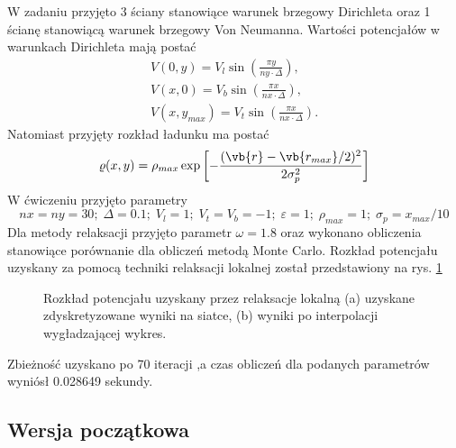 \documentclass[a4paper, 12pt]{article}
\begin{document}
	W zadaniu przyjęto 3 ściany stanowiące warunek brzegowy Dirichleta oraz 1 ścianę stanowiącą warunek brzegowy Von Neumanna. 
	Wartości potencjałów w warunkach Dirichleta mają postać
	\begin{gather}
		V(0,y) = V_l \sin(\frac{\pi y}{ny \cdot \Delta}),
		\\
		V(x,0) = V_b \sin(\frac{\pi x}{nx \cdot \Delta}),
		\\
		V(x,y_{max}) = V_t \sin(\frac{\pi x}{nx \cdot \Delta}).
	\end{gather}
	Natomiast przyjęty rozkład ładunku ma postać 
	\begin{equation}
		\varrho(x,y) = \rho_{max} \exp\left[-\frac{(\vb{r} - \vb{r_{max}}/2)^2}{2\sigma_p^2}\right]
	\end{equation}
	W ćwiczeniu przyjęto parametry
	\[nx = ny = 30; \; \Delta = 0.1; \; V_l = 1; \; V_t = V_b = -1; \; \varepsilon = 1; \; \rho_{max} = 1; \; \sigma_p = x_{max}/10 \]
	Dla metody relaksacji przyjęto parametr $\omega = 1.8$ oraz wykonano obliczenia stanowiące porównanie dla obliczeń metodą Monte Carlo.
	Rozkład potencjału uzyskany za pomocą techniki relaksacji lokalnej został przedstawiony na rys. \ref{local_relax}
	
	\begin{figure}[h]
		\centering
		\begin{subfigure}{0.49\textwidth}
			\centering
			
			\caption{}		
		\end{subfigure}
		\begin{subfigure}{0.49\textwidth}
			\centering
			
			\caption{}		
		\end{subfigure}
		\caption{Rozkład potencjału uzyskany przez relaksacje lokalną (a) uzyskane zdyskretyzowane wyniki na siatce, (b) wyniki po interpolacji wygładzającej wykres.}
		\label{local_relax}
	\end{figure}
	
	\noindent Zbieżność uzyskano po 70 iteracji ,a czas obliczeń dla podanych parametrów wyniósł 0.028649 sekundy.
	
	\subsection*{Wersja początkowa}
	
\end{document}

